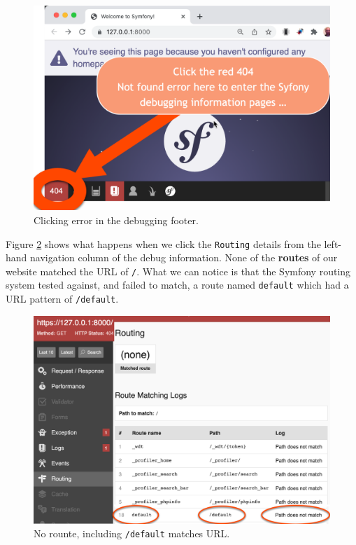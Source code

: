 \documentclass[a4paperpaper,openright]{book}
\begin{document}
\begin{figure}
\centering
\includegraphics[width=1\textwidth,height=\textheight]{./tex2pdf.-b567767c1af560fd/d6e39948cb9fdf4d77a4c1cb81d386e6c517e7ee.png}
\caption{Clicking error in the debugging
footer.\label{404_homepage_link}}
\end{figure}

Figure \ref{no_route_matches} shows what happens when we click the
\texttt{Routing} details from the left-hand navigation column of the
debug information. None of the \textbf{routes} of our website matched
the URL of \texttt{/}. What we can notice is that the Symfony routing
system tested against, and failed to match, a route named
\texttt{default} which had a URL pattern of \texttt{/default}.

\begin{figure}
\centering
\includegraphics[width=1\textwidth,height=\textheight]{./tex2pdf.-b567767c1af560fd/2c80a4fb4ccfecb9a3fbb31044469d298f9c2d29.png}
\caption{No rounte, including \texttt{/default} matches
URL.\label{no_route_matches}}
\end{figure}
\end{document}
